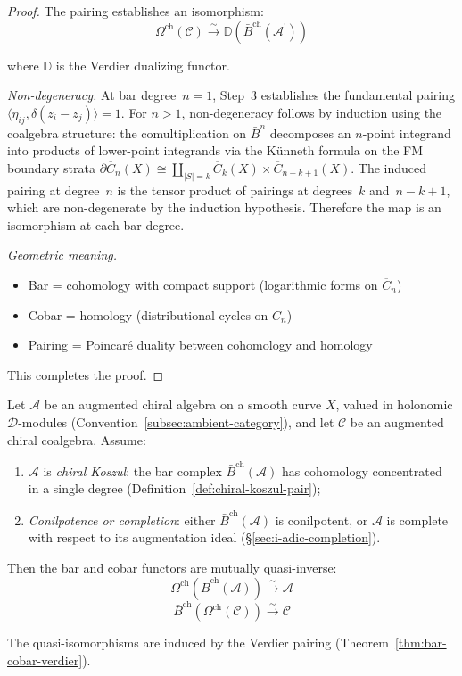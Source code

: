 \begin{proof}
The pairing establishes an isomorphism:
\[\Omega^{\text{ch}}(\mathcal{C}) \xrightarrow{\sim} \mathbb{D}(\bar{B}^{\text{ch}}(\mathcal{A}^!))\]

where $\mathbb{D}$ is the Verdier dualizing functor.

\emph{Non-degeneracy.}
At bar degree~$n = 1$, Step~3 establishes the fundamental pairing
$\langle \eta_{ij}, \delta(z_i - z_j) \rangle = 1$.  For $n > 1$,
non-degeneracy follows by induction using the coalgebra structure: the
comultiplication on $\bar{B}^n$ decomposes an $n$-point integrand into
products of lower-point integrands via the K\"unneth formula on the
FM boundary strata $\partial\overline{C}_n(X) \cong
\coprod_{|S|=k} \overline{C}_k(X) \times \overline{C}_{n-k+1}(X)$.
The induced pairing at degree~$n$ is the tensor product of
pairings at degrees~$k$ and~$n{-}k{+}1$, which are non-degenerate
by the induction hypothesis.  Therefore the map is an isomorphism
at each bar degree.

\emph{Geometric meaning.}
\begin{itemize}
\item Bar = cohomology with compact support (logarithmic forms on $\overline{C}_n$)
\item Cobar = homology (distributional cycles on $C_n$)
\item Pairing = Poincar\'e duality between cohomology and homology
\end{itemize}

This completes the proof.
\end{proof}

\begin{corollary}\label{cor:bar-cobar-inverse}
Let $\mathcal{A}$ be an augmented chiral algebra on a smooth curve $X$,
valued in holonomic $\mathcal{D}$-modules
(Convention~\ref{subsec:ambient-category}), and let $\mathcal{C}$ be an
augmented chiral coalgebra.  Assume:
\begin{enumerate}[label=(\roman*)]
\item $\mathcal{A}$ is \emph{chiral Koszul}: the bar complex
  $\bar{B}^{\mathrm{ch}}(\mathcal{A})$ has cohomology concentrated in a
  single degree (Definition~\ref{def:chiral-koszul-pair});
\item \emph{Conilpotence or completion}: either
  $\bar{B}^{\mathrm{ch}}(\mathcal{A})$ is conilpotent, or $\mathcal{A}$
  is complete with respect to its augmentation ideal
  (\S\ref{sec:i-adic-completion}).
\end{enumerate}
Then the bar and cobar functors are mutually quasi-inverse:
\[\Omega^{\mathrm{ch}}(\bar{B}^{\mathrm{ch}}(\mathcal{A})) \xrightarrow{\sim} \mathcal{A}\]
\[\bar{B}^{\mathrm{ch}}(\Omega^{\mathrm{ch}}(\mathcal{C})) \xrightarrow{\sim} \mathcal{C}\]

The quasi-isomorphisms are induced by the Verdier pairing
(Theorem~\ref{thm:bar-cobar-verdier}).
\end{corollary}

